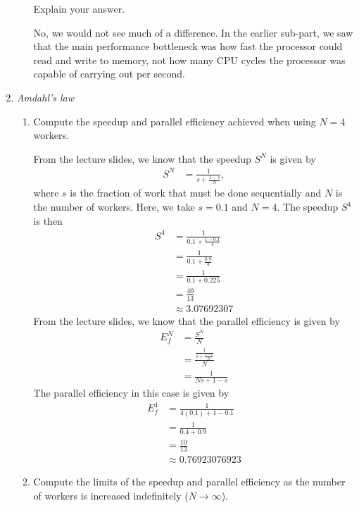 \documentclass{article}
\begin{document}
\begin{enumerate}
\begin{enumerate}
        Explain your answer.
        \par 
        No, we would not see much of a difference.
        In the earlier sub-part, we saw that the main performance bottleneck was how fast the processor could read and write to memory, not how many CPU cycles the processor was capable of carrying out per second.
    \end{enumerate}
    \item \textit{Amdahl's law}
    \begin{enumerate}
        \item Compute the speedup and parallel efficiency achieved when using $N = 4$ workers.
        \par 
        From the lecture slides, we know that the speedup $S^{N}$ is given by
        \begin{align*}
            S^{N} & = \frac{1}{s + \frac{1-s}{N}},
        \end{align*}
        where $s$ is the fraction of work that must be done sequentially and $N$ is the number of workers.
        Here, we take $s = 0.1$ and $N = 4$.
        The speedup $S^{4}$ is then
        \begin{align*}
            S^{4} & = \frac{1}{0.1 + \frac{1-0.1}{4}} \\
            & = \frac{1}{0.1 + \frac{0.9}{4}} \\
            & = \frac{1}{0.1 + 0.225} \\
            & = \frac{40}{13} \\
            & \approx 3.07692307
        \end{align*}
        From the lecture slides, we know that the parallel efficiency is given by 
        \begin{align*}
            E_{f}^{N} & = \frac{S^{N}}{N} \\
            & = \frac{\frac{1}{s + \frac{1-s}{N}}}{N} \\
            & = \frac{1}{Ns + 1 - s}
        \end{align*}
        The parallel efficiency in this case is given by 
        \begin{align*}
            E^{4}_{f} & = \frac{1}{4(0.1) + 1 - 0.1} \\
            & = \frac{1}{0.4 + 0.9} \\
            & = \frac{10}{13} \\
            & \approx 0.76923076923
        \end{align*}
        \item Compute the limits of the speedup and parallel efficiency as the number of workers is increased indefinitely ($N \rightarrow \infty$).

\end{enumerate}
\end{enumerate}
\end{document}

